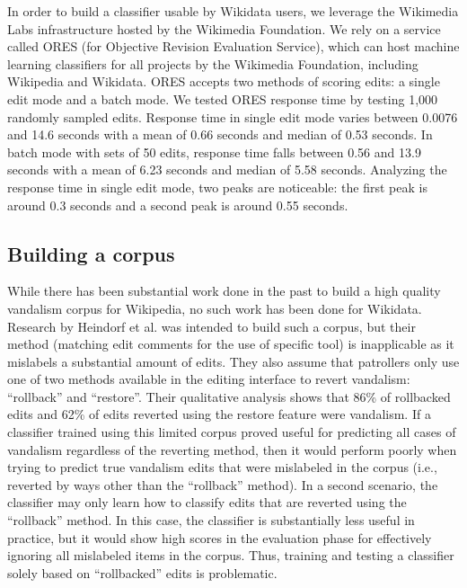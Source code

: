\documentclass{sig-alternate}
\begin{document}
In order to build a classifier usable by Wikidata users, we leverage the Wikimedia Labs infrastructure hosted by the Wikimedia Foundation. We rely on a service called ORES (for Objective Revision Evaluation Service), which can host machine learning classifiers for all projects by the Wikimedia Foundation, including Wikipedia and Wikidata. ORES accepts two methods of scoring edits: a single edit mode and a batch mode. We tested ORES response time by testing 1,000 randomly sampled edits. Response time in single edit mode varies between 0.0076 and 14.6 seconds with a mean of 0.66 seconds and median of 0.53 seconds. In batch mode with sets of 50 edits, response time falls between 0.56 and 13.9 seconds with a mean of 6.23 seconds and median of 5.58 seconds. Analyzing the response time in single edit mode, two peaks are noticeable: the first peak is around 0.3 seconds and a second peak is around 0.55 seconds.

\subsection{Building a corpus}
While there has been substantial work done in the past to build a high quality vandalism corpus for Wikipedia\cite{potthast:crowdsourcing}, no such work has been done for Wikidata.  Research by Heindorf et al.\cite{heindorf:towards} was intended to build such a corpus, but their method (matching edit comments for the use of specific tool) is inapplicable as it mislabels a substantial amount of edits.  They also assume that patrollers only use one of two methods available in the editing interface to revert vandalism: ``rollback'' and ``restore''.  Their qualitative analysis shows that 86\% of rollbacked edits and 62\% of edits reverted using the restore feature were vandalism.  If a classifier trained using this limited corpus proved useful for predicting all cases of vandalism regardless of the reverting method, then it would perform poorly when trying to predict true vandalism edits that were mislabeled in the corpus (i.e., reverted by ways other than the ``rollback'' method).  In a second scenario, the classifier may only learn how to classify edits that are reverted using the ``rollback'' method. In this case, the classifier is substantially less useful in practice, but it would show high scores in the evaluation phase for effectively ignoring all mislabeled items in the corpus.  Thus, training and testing a classifier solely based on ``rollbacked'' edits is problematic.
\end{document}
